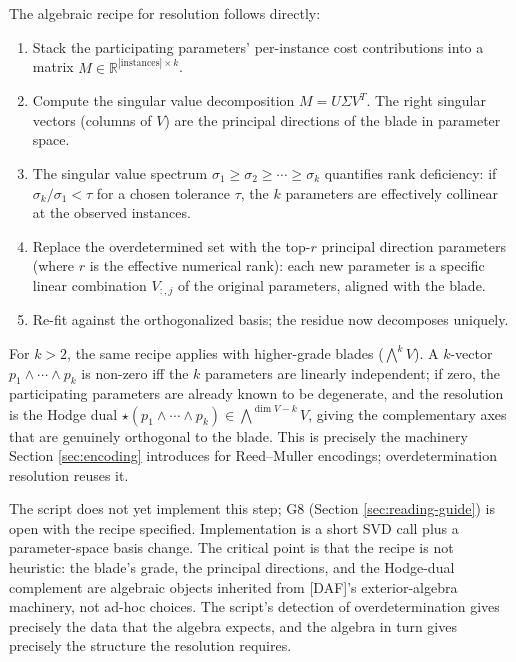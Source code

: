 The algebraic recipe for resolution follows directly:

\begin{enumerate}[nosep,label=(\arabic*)]
  \item Stack the participating parameters' per-instance
    cost contributions into a matrix $M \in
    \mathbb{R}^{|\mathrm{instances}| \times k}$.
  \item Compute the singular value decomposition
    $M = U \Sigma V^T$. The right singular vectors
    (columns of $V$) are the principal directions of
    the blade in parameter space.
  \item The singular value spectrum $\sigma_1 \geq
    \sigma_2 \geq \cdots \geq \sigma_k$ quantifies
    rank deficiency: if $\sigma_k / \sigma_1 < \tau$
    for a chosen tolerance $\tau$, the $k$ parameters
    are effectively collinear at the observed instances.
  \item Replace the overdetermined set with the
    top-$r$ principal direction parameters (where $r$
    is the effective numerical rank): each new
    parameter is a specific linear combination
    $V_{:,j}$ of the original parameters, aligned with
    the blade.
  \item Re-fit against the orthogonalized basis; the
    residue now decomposes uniquely.
\end{enumerate}

For $k > 2$, the same recipe applies with higher-grade
blades ($\bigwedge^k V$). A $k$-vector $p_1 \wedge
\cdots \wedge p_k$ is non-zero iff the $k$ parameters
are linearly independent; if zero, the participating
parameters are already known to be degenerate, and the
resolution is the Hodge dual $\star (p_1 \wedge \cdots
\wedge p_k) \in \bigwedge^{\dim V - k} V$, giving the
complementary axes that are genuinely orthogonal to
the blade. This is precisely the machinery
Section \ref{sec:encoding} introduces for Reed--Muller
encodings; overdetermination resolution reuses it.

The script does not yet implement this step; G8
(Section \ref{sec:reading-guide}) is open with the
recipe specified. Implementation is a short SVD
call plus a parameter-space basis change. The
critical point is that the recipe is not heuristic:
the blade's grade, the principal directions, and the
Hodge-dual complement are algebraic objects inherited
from [DAF]'s exterior-algebra machinery, not ad-hoc
choices. The script's detection of
overdetermination gives precisely the data that the
algebra expects, and the algebra in turn gives
precisely the structure the resolution requires.

